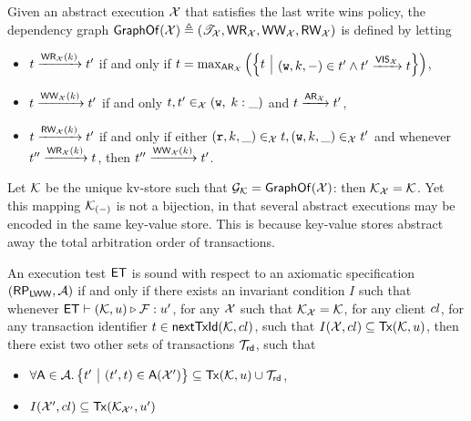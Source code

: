 \begin{definition}
\label{def:main-body-aexec2graph}
Given an abstract execution $\mathcal{X}$ that satisfies the last write wins policy,
the dependency graph $\mathsf{GraphOf}(\mathcal{X}) \triangleq (\mathscr{T}_{\mathcal{X}}, \mathsf{WR}_{\mathcal{X}}, 
\mathsf{WW}_{\mathcal{X}}, \mathsf{RW}_{\mathcal{X}})$ is defined by letting
\begin{itemize}
\item $t \xrightarrow{\mathsf{WR}_{\mathcal{X}}(k)} t'$ if and only if 
    $\txid = \max_{\AR_{\aexec}}\left( \Setcon{\txid}{(\otW,\ke,\stub) \in \txid' \land \txid' \toEdge{\VIS_\aexec} \txid } \right)$, 
\item $t \xrightarrow{\mathsf{WW}_{\mathcal{X}}(k)} t'$ if and only 
$t, t' \in_{\mathcal{X}} (\textnormal{\texttt w}, \;k: \_)$ 
and $t \xrightarrow{\mathsf{AR}_{\mathcal{X}}} t'$,
\item $t \xrightarrow{\mathsf{RW}_{\mathcal{X}}(k)} t'$ if and only if either 
$(\textnormal{\texttt r}, k, \_) \in_{\mathcal{X}} t, (\textnormal{\texttt w}, k, \_) \in_{\mathcal{X}} t'$ and 
whenever $t'' \xrightarrow{\mathsf{WR}_{\mathcal{X}}(k)} t$, 
then $t'' \xrightarrow{\mathsf{WW}_{\mathcal{X}}(k)} t'$.
\end{itemize}
\end{definition}

Let $\mathcal{K}$ be the unique kv-store such that $\mathcal{G}_{\mathcal{K}} = \mathsf{GraphOf}(\mathcal{X})$: then 
$\mathcal{K}_{\mathcal{X}} = \mathcal{K}$. 
Yet this mapping $\mathcal{K}_{(-)}$ is not a bijection, 
in that several abstract executions may be encoded in the same key-value store. 
This is because key-value stores abstract away the total arbitration order of transactions.


\begin{definition}
\label{def:main-body-et_sound}
An execution test $\mathsf{ET}$ is sound with respect to an axiomatic 
specification $(\mathsf{RP}_{\mathsf{LWW}}, \mathcal{A})$ if and only if there exists an 
invariant condition $I$ such that whenever $\mathsf{ET} \vdash (\mathcal{K}, u) 
\triangleright \mathcal{F}: u'$, for any $\mathcal{X}$ such that 
$\mathcal{K}_{\mathcal{X}} = \mathcal{K}$, for any client ${cl}$, for any 
transaction identifier $t \in \mathsf{nextTxId}(\mathcal{K}, {cl})$, 
such that  $I(\mathcal{X}, {cl}) \subseteq \mathsf{Tx}(\mathcal{K}, u)$, then  
there exist two other sets of transactions $\mathcal{T}_{\mathsf{rd}}$, 
such that 
\begin{itemize}
\item $\forall \A \in \Ax. \Setcon{\txid' }{ (\txid', \txid) \in \A(\aexec')} \subseteq \Tx(\hh, \vi) \cup \T_{\rd}$, 
\item $I(\mathcal{X}', {cl}) \subseteq \mathsf{Tx}(\mathcal{K}_{\mathcal{X}'}, u')$
\end{itemize}
\end{definition}

